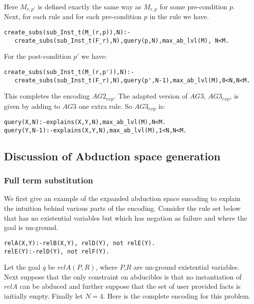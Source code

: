 \documentclass[sigconf]{acmart}
\begin{document}
Here $M_{r,p'}$ is defined exactly the same way as $M_{r,p}$ for some pre-condition $p$. Next, for each rule and for each pre-condition $p$ in the rule we have.
\begin{lstlisting}[frame=none]
create_subs(sub_Inst_t(M_(r,p)),N):-
   create_subs(sub_Inst_t(F_r),N),query(p,N),max_ab_lvl(M), N<M.   
\end{lstlisting}

For the post-condition $p'$ we have:
\begin{lstlisting}[frame=none]
create_subs(sub_Inst_t(M_(r,p')),N):-
   create_subs(sub_Inst_t(F_r),N),query(p',N-1),max_ab_lvl(M),0<N,N<M.   
\end{lstlisting}

This completes the encoding $AG2_{exp}$. The adapted version of $AG3$,
$AG3_{exp}$, is given by adding to $AG3$ one extra rule. So $AG3_{exp}$ is: 
\begin{lstlisting}[frame=none]
query(X,N):-explains(X,Y,N),max_ab_lvl(M),N<M.
query(Y,N-1):-explains(X,Y,N),max_ab_lvl(M),1<N,N<M.
\end{lstlisting}


\subsection{Discussion of Abduction space generation}

\subsubsection{Full term substitution}
We first give an example of the expanded abduction space encoding to explain
the intuition behind various parts of the encoding. Consider the rule set
below that has no existential variables but which has negation as failure and
where the goal is un-ground.
\begin{lstlisting}[frame=none]
relA(X,Y):-relB(X,Y), relD(Y), not relE(Y).
relE(Y):-relD(Y), not relF(Y).
\end{lstlisting}
Let the goal $q$ be $relA(P,R)$, where $P$,$R$ are un-ground existential
variables. Next suppose that the only constraint on abducibles is that no
instantiation of $relA$ can be abduced and further suppose that the set of
user provided facts is initially empty. Finally let $N=4$. Here is the
complete encoding for this problem.
\end{document}
